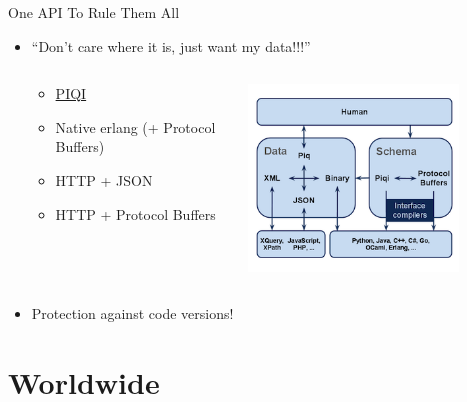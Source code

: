 \documentclass[aspectratio=169]{beamer}
\begin{document}
\begin{frame}{One API To Rule Them All}
    \begin{itemize}
        \item ``Don't care where it is, just want my data!!!''
        \pause
        \begin{columns}
            \begin{column}[c]{0.6\textwidth}
                    \begin{itemize}
                        \item \href{http://piqi.org}{PIQI}
                        \item Native erlang (+ Protocol Buffers)
                        \item HTTP + JSON
                        \item HTTP + Protocol Buffers
                    \end{itemize}
            \end{column}
            \begin{column}[c]{0.4\textwidth}
                \includegraphics[width=0.8\textwidth]{images/piqi.png}
            \end{column}
        \end{columns}
        \item Protection against code versions!
    \end{itemize}
\end{frame}

\section{Worldwide}
\end{document}
